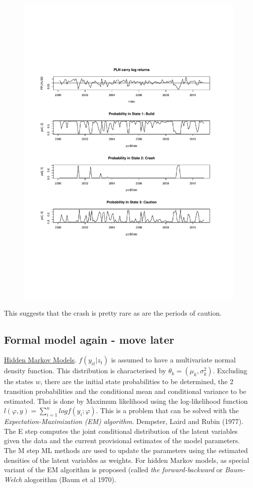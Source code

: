 \documentclass[12pt, a4paper, oneside]{article} %
\begin{document}
\begin{figure}[h]
\centering
\includegraphics[scale = .80]{../Figures/PLNUSD.pdf}
\end{figure}

This suggests that the crash is pretty rare as are the periods of caution. 

\subsection{Formal model again - move later}
\href{http://en.wikipedia.org/wiki/Hidden_Markov_model}{Hidden Markov Models}.  
$f(y_{it}|z_t)$ is assumed to have a multivariate normal density function. This distribution is characterised by $\theta_k = (\mu_k, \sigma_k^2)$.  Excluding the states $w$, there are the initial state probabilities to be determined, the 2 transition probabilities and the conditional mean and conditional variance to be estimated.  Thsi is done by Maximum likelihood using the log-likelihood function $l(\varphi, y) = \sum_{i=1}^n log f(y_i; \varphi)$. This is a problem that can be solved with the \emph{Expectation-Maximization (EM) algorithm}.  Dempster, Laird and Rubin (1977).  The E step computes the joint conditional distribution of the latent variables given the data and the current provisional estimates of the model parameters. The M step ML methods are used to update the parameters using the estimated densities of the latent variables as weights. For hidden Markov models, as special variant of the EM algorithm is proposed (called \emph{the forward-backward} or \emph{Baum-Welch} alogorithm (Baum et al 1970).   
\end{document}
